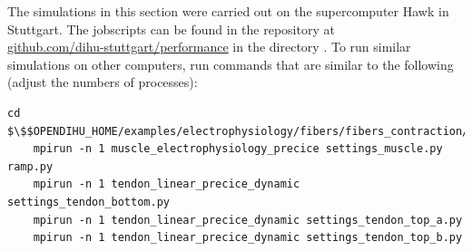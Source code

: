 \begin{reproduce_no_break}
  The simulations in this section were carried out on the supercomputer Hawk in Stuttgart. The jobscripts can be found in the repository at \\ \href{https://github.com/dihu-stuttgart/performance}{github.com/dihu-stuttgart/performance} in the directory . To run similar simulations on other computers, run commands that are similar to the following (adjust the numbers of processes):
  \begin{lstlisting}[columns=fullflexible,breaklines=true,postbreak=\mbox{\textcolor{gray}{$\hookrightarrow$}\space}]
    cd $\$$OPENDIHU_HOME/examples/electrophysiology/fibers/fibers_contraction/with_tendons_precice/multiple_tendons_with_electrophysiology
    mpirun -n 1 muscle_electrophysiology_precice settings_muscle.py ramp.py
    mpirun -n 1 tendon_linear_precice_dynamic settings_tendon_bottom.py
    mpirun -n 1 tendon_linear_precice_dynamic settings_tendon_top_a.py
    mpirun -n 1 tendon_linear_precice_dynamic settings_tendon_top_b.py
  \end{lstlisting}
\end{reproduce_no_break}



%

%



%

